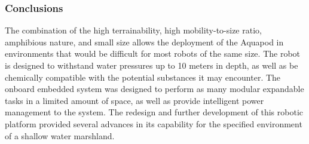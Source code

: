 

\subsubsection{ Conclusions}

The combination of the high terrainability, high mobility-to-size ratio, amphibious nature, and small size allows the deployment of the Aquapod in environments that would be difficult for most robots of the same size. The robot is designed to withstand water pressures up to 10 meters in depth, as well as be chemically compatible with the potential substances it may encounter.  The onboard embedded system was designed to perform as many modular expandable tasks in a limited amount of space, as well as provide intelligent power management to the system.  The redesign and further development of this robotic platform provided several advances in its capability for the specified environment of a shallow water marshland.

